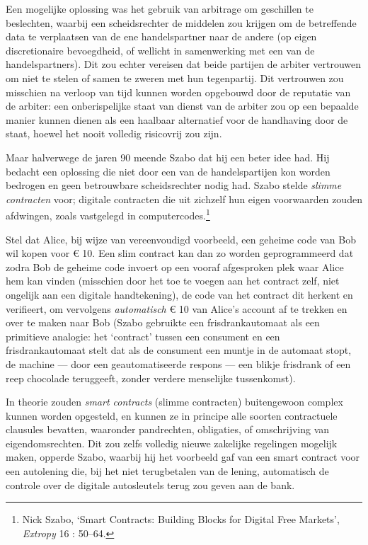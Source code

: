 \documentclass[
  a5paper,
  smalldemyvopaper,11pt,twoside,onecolumn,openright,extrafontsizes]{memoir}
\begin{document}
Een mogelijke oplossing was het gebruik van arbitrage om geschillen te
beslechten, waarbij een scheidsrechter de middelen zou krijgen om de
betreffende data te verplaatsen van de ene handelspartner naar de andere
(op eigen discretionaire bevoegdheid, of wellicht in samenwerking met
een van de handelspartners). Dit zou echter vereisen dat beide partijen
de arbiter vertrouwen om niet te stelen of samen te zweren met hun
tegenpartij. Dit vertrouwen zou misschien na verloop van tijd kunnen
worden opgebouwd door de reputatie van de arbiter: een onberispelijke
staat van dienst van de arbiter zou op een bepaalde manier kunnen dienen
als een haalbaar alternatief voor de handhaving door de staat, hoewel
het nooit volledig risicovrij zou zijn.

Maar halverwege de jaren 90 meende Szabo dat hij een beter idee had. Hij
bedacht een oplossing die niet door een van de handelspartijen kon
worden bedrogen en geen betrouwbare scheidsrechter nodig had. Szabo
stelde \emph{slimme contracten} voor; digitale contracten die uit
zichzelf hun eigen voorwaarden zouden afdwingen, zoals vastgelegd in
computercodes.\footnote{Nick Szabo, `Smart Contracts: Building Blocks
  for Digital Free Markets', \emph{Extropy} 16 : 50--64.}

Stel dat Alice, bij wijze van vereenvoudigd voorbeeld, een geheime code
van Bob wil kopen voor € 10. Een slim contract kan dan zo worden
geprogrammeerd dat zodra Bob de geheime code invoert op een vooraf
afgesproken plek waar Alice hem kan vinden (misschien door het toe te
voegen aan het contract zelf, niet ongelijk aan een digitale
handtekening), de code van het contract dit herkent en verifieert, om
vervolgens \emph{automatisch} € 10 van Alice's account af te trekken en
over te maken naar Bob (Szabo gebruikte een frisdrankautomaat als een
primitieve analogie: het `contract' tussen een consument en een
frisdrankautomaat stelt dat als de consument een muntje in de automaat
stopt, de machine --- door een geautomatiseerde respons --- een blikje
frisdrank of een reep chocolade teruggeeft, zonder verdere menselijke
tussenkomst).

In theorie zouden \emph{smart contracts} (slimme contracten)
buitengewoon complex kunnen worden opgesteld, en kunnen ze in principe
alle soorten contractuele clausules bevatten, waaronder pandrechten,
obligaties, of omschrijving van eigendomsrechten. Dit zou zelfs volledig
nieuwe zakelijke regelingen mogelijk maken, opperde Szabo, waarbij hij
het voorbeeld gaf van een smart contract voor een autolening die, bij
het niet terugbetalen van de lening, automatisch de controle over de
digitale autosleutels terug zou geven aan de bank.
\end{document}
